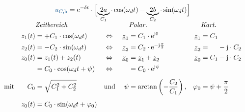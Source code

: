 \begin{frame}[t]%
\b{%
\begin{align*}
    \ecv{u_{C,\mathrm{h}}} &= \mathrm{e}^{-\delta t} \cdot
    \left[\vphantom{\Big|}\smash{
    \underbrace{2a}_{C_1} \cdot \cos(\omega_d t) - \underbrace{2b}_{C_2} \cdot \sin(\omega_d t)
    }\right]
\end{align*}%
}%
\ifvmode\vspace*{-\baselineskip}\setlength{\parskip}{4pt}\fi%
\begin{align}
    &&&\mathrlap{\textit{Zeitbereich}}&&&&\mathrlap{\textit{Polar.}}&&\mathrlap{\textit{Kart.}} &&\nonumber\\
    &&
        z_1(t) &= +C_1 \cdot \cos(\omega_d t)&
        &\Leftrightarrow&
        \underline{z}_1 &= C_1 \cdot \mathrm{e}^{\mathrm{j}0} &
        \underline{z}_1 &= C_1 \nonumber\\
    &&
        z_2(t) &= -C_2 \cdot \sin(\omega_d t)&
        &\Leftrightarrow&
        \underline{z}_2 &= C_2 \cdot \mathrm{e}^{-\mathrm{j}\frac{\pi}{2}} &
        \underline{z}_2 &= \hphantom{C_1} - \mathrm{j} \cdot C_2 \nonumber\\
    &&
        z_0(t) &= z_1(t) + z_2(t)&
        &\Leftrightarrow&
        \underline{z}_0 &= \underline{z}_1 + \underline{z}_2 &
        \underline{z}_0 &= C_1 - \mathrm{j} \cdot C_2 \nonumber\\
    &&
        &= C_0 \cdot \cos(\omega_d t + \psi)&
        &\Leftrightarrow&
        \hphantom{z_0} &= C_0 \cdot \mathrm{e}^{\mathrm{j}\psi} \nonumber\\[4pt]
    &\text{mit}&
        C_0 &= \sqrt{C_1^2 + C_2^2}&
        &\text{und}&
        \psi  &= \arctan\left(-\frac{C_2}{C_1}\right),
        &\varphi_0 &= \psi + \frac{\pi}{2} \nonumber\\[4pt]
    &&
        z_0(t) &= C_0 \cdot \sin(\omega_d t + \varphi_0) \label{eq:dgl:rlc:homolsg:periodisch:zeigeraddition}
\end{align}%
\b{%
\vfill%
\begin{align*}

\end{align*}}
\end{frame}
